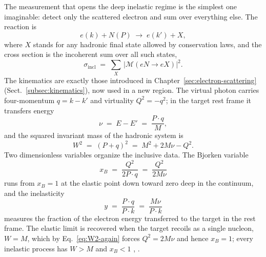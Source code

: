 The measurement that opens the deep inelastic regime is the simplest one imaginable:
detect only the scattered electron and sum over everything else. The reaction is
\begin{equation}
    e(k) + N(P) \;\rightarrow\; e(k') + X,
    \label{eq:inclusive-reaction}
\end{equation}
where $X$ stands for any hadronic final state allowed by conservation laws, and the
cross section is the incoherent sum over all such states,
\begin{equation}
    \sigma_{\mathrm{incl}} \;=\; \sum_{X}\,\bigl|\mathcal{M}(eN\to eX)\bigr|^{2}.
    \label{eq:sigma-incl}
\end{equation}
The kinematics are exactly those introduced in Chapter~\ref{sec:electron-scattering}
(Sect.~\ref{subsec:kinematics}), now used in a new region. The virtual photon carries
four-momentum $q=k-k'$ and virtuality $Q^{2}=-q^{2}$; in the target rest frame it
transfers energy
\begin{equation}
    \nu \;=\; E - E' \;=\; \frac{P\cdot q}{M},
\end{equation}
and the squared invariant mass of the hadronic system is
\begin{equation}
    W^{2} \;=\; (P+q)^{2} \;=\; M^{2} + 2M\nu - Q^{2}.
    \label{eq:W2-again}
\end{equation}
Two dimensionless variables organize the inclusive data. The Bjorken variable
\begin{equation}
    x_{B} \;=\; \frac{Q^{2}}{2P\cdot q} \;=\; \frac{Q^{2}}{2M\nu}
    \label{eq:xB-again}
\end{equation}
runs from $x_{B}=1$ at the elastic point down toward zero deep in the continuum, and
the inelasticity
\begin{equation}
    y \;=\; \frac{P\cdot q}{P\cdot k} \;=\; \frac{M\nu}{P\cdot k}
    \label{eq:inelasticity}
\end{equation}
measures the fraction of the electron energy transferred to the target in the rest
frame. The elastic limit is recovered when the target recoils as a single nucleon,
$W=M$, which by Eq.~\eqref{eq:W2-again} forces $Q^{2}=2M\nu$ and hence $x_{B}=1$; every
inelastic process has $W>M$ and $x_{B}<1$ \cite[Ch.~1]{Amsler2018},
\cite[Ch.~4]{ThomasWeise2001}.

